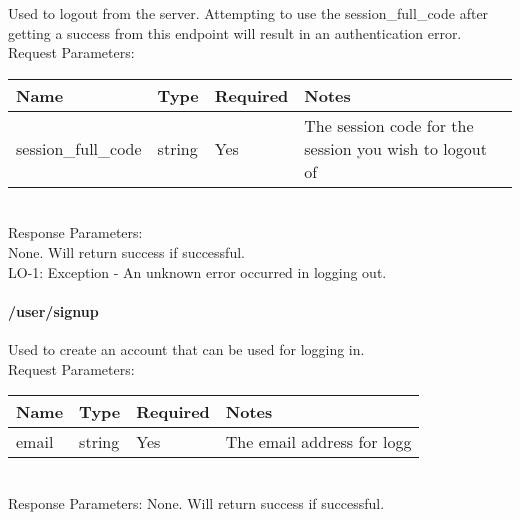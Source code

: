\documentclass{article}[11pt]
\begin{document}
Used to logout from the server. Attempting to use the session\_full\_code after getting a success from this endpoint will result in an authentication error.  \\

\noindent
Request Parameters:

\noindent
\begin{tabular}{|l|l|l|l|}
\hline
\textbf{Name} & \textbf{Type} & \textbf{Required} & \textbf{Notes} \\
\hline
session\_full\_code & string & Yes & The session code for the session you wish to logout of \\
\hline
\end{tabular} \\

\noindent
Response Parameters: \\
None. Will return success if successful. \\

\ErrorsSession
LO-1: Exception - An unknown error occurred in logging out.


\paragraph{/user/signup}\textbf{}

Used to create an account that can be used for logging in.  \\

\noindent
Request Parameters:

\noindent
\begin{tabular}{|l|l|l|l|}
\hline
\textbf{Name} & \textbf{Type} & \textbf{Required} & \textbf{Notes} \\
\hline
email & string & Yes & The email address for logg \\
\hline
\end{tabular} \\

\noindent
Response Parameters:
None. Will return success if successful.
\end{document}
